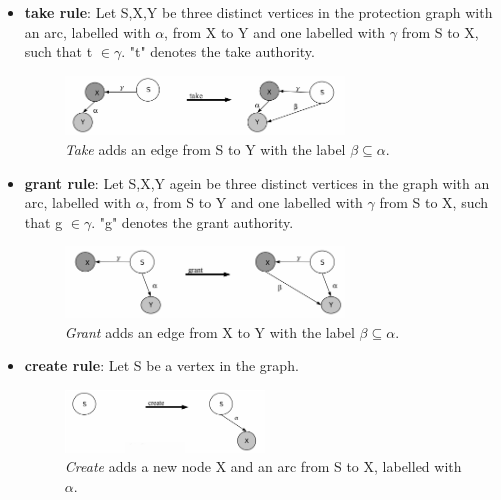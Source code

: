 \begin{itemize}
\item \textbf{take rule}: Let S,X,Y be three distinct vertices in the protection graph with an arc, labelled with $\alpha$, from X to Y and one labelled with $\gamma$ from S to X, such that t $\in \gamma.$  "t" denotes the take authority.
\begin{figure}[ht]
\centering
	\includegraphics[width=0.7\textwidth]{./Pictures/takeRule.png}
	\caption[take rule]{\textit{Take} adds an edge from S to Y with the label $\beta \subseteq \alpha$. \cite{TakeG}}
	\label{fig:cltake}
\end{figure}	
	
\item \textbf{grant rule}:	Let S,X,Y agein be three distinct vertices in the graph with an arc, labelled with  $\alpha$, from S to Y and one labelled with $\gamma$ from S to X, such that g $\in \gamma$. "g" denotes the grant authority.
\begin{figure}[ht]
\centering
	\includegraphics[width=0.7\textwidth]{./Pictures/grantRule.png}
	\caption[grant rule]{\textit{Grant} adds an edge from X to Y with the label $\beta \subseteq \alpha$.  \cite{TakeG}}
	\label{fig:clgrant}
\end{figure}	
	
\item \textbf{create rule}: Let S be a vertex in the graph. 
\begin{figure}[H]
\centering
	\includegraphics[width=0.5\textwidth]{./Pictures/createRule.png}
	\caption[create rule]{\textit{Create} adds a new node X and an arc from S to X, labelled with $\alpha$. \cite{TakeG}}
	\label{fig:clcreate}
\end{figure}	


\end{itemize}
